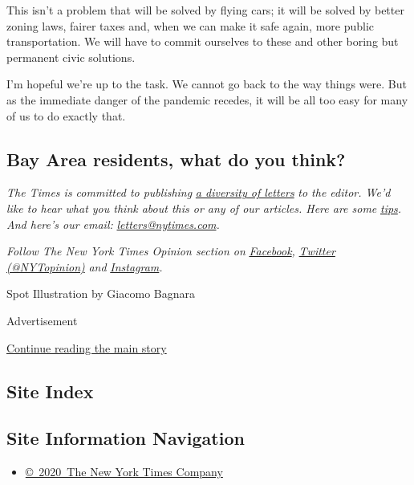 This isn't a problem that will be solved by flying cars; it will be
solved by better zoning laws, fairer taxes and, when we can make it safe
again, more public transportation. We will have to commit ourselves to
these and other boring but permanent civic solutions.

I'm hopeful we're up to the task. We cannot go back to the way things
were. But as the immediate danger of the pandemic recedes, it will be
all too easy for many of us to do exactly that.

\hypertarget{bay-area-residents-what-do-you-think}{%
\subsection{Bay Area residents, what do you
think?}\label{bay-area-residents-what-do-you-think}}

\emph{The Times is committed to publishing}
\href{https://www.nytimes.com/2019/01/31/opinion/letters/letters-to-editor-new-york-times-women.html}{\emph{a
diversity of letters}} \emph{to the editor. We'd like to hear what you
think about this or any of our articles. Here are some}
\href{https://help.nytimes.com/hc/en-us/articles/115014925288-How-to-submit-a-letter-to-the-editor}{\emph{tips}}\emph{.
And here's our email:}
\href{mailto:letters@nytimes.com}{\emph{letters@nytimes.com}}\emph{.}

\emph{Follow The New York Times Opinion section on}
\href{https://www.facebook.com/nytopinion}{\emph{Facebook}}\emph{,}
\href{http://twitter.com/NYTOpinion}{\emph{Twitter (@NYTopinion)}}
\emph{and}
\href{https://www.instagram.com/nytopinion/}{\emph{Instagram}}\emph{.}

Spot Illustration by Giacomo Bagnara

Advertisement

\protect\hyperlink{after-bottom}{Continue reading the main story}

\hypertarget{site-index}{%
\subsection{Site Index}\label{site-index}}

\hypertarget{site-information-navigation}{%
\subsection{Site Information
Navigation}\label{site-information-navigation}}

\begin{itemize}
\tightlist
\item
  \href{https://help.nytimes.com/hc/en-us/articles/115014792127-Copyright-notice}{©~2020~The
  New York Times Company}
\end{itemize}

